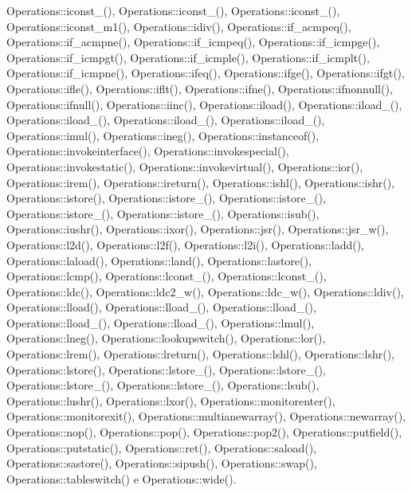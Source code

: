 Operations\+::iconst\+\_(), Operations\+::iconst\+\_(), Operations\+::iconst\+\_(), Operations\+::iconst\+\_\+m1(), Operations\+::idiv(), Operations\+::if\+\_\+acmpeq(), Operations\+::if\+\_\+acmpne(), Operations\+::if\+\_\+icmpeq(), Operations\+::if\+\_\+icmpge(), Operations\+::if\+\_\+icmpgt(), Operations\+::if\+\_\+icmple(), Operations\+::if\+\_\+icmplt(), Operations\+::if\+\_\+icmpne(), Operations\+::ifeq(), Operations\+::ifge(), Operations\+::ifgt(), Operations\+::ifle(), Operations\+::iflt(), Operations\+::ifne(), Operations\+::ifnonnull(), Operations\+::ifnull(), Operations\+::iinc(), Operations\+::iload(), Operations\+::iload\+\_(), Operations\+::iload\+\_(), Operations\+::iload\+\_(), Operations\+::iload\+\_(), Operations\+::imul(), Operations\+::ineg(), Operations\+::instanceof(), Operations\+::invokeinterface(), Operations\+::invokespecial(), Operations\+::invokestatic(), Operations\+::invokevirtual(), Operations\+::ior(), Operations\+::irem(), Operations\+::ireturn(), Operations\+::ishl(), Operations\+::ishr(), Operations\+::istore(), Operations\+::istore\+\_(), Operations\+::istore\+\_(), Operations\+::istore\+\_(), Operations\+::istore\+\_(), Operations\+::isub(), Operations\+::iushr(), Operations\+::ixor(), Operations\+::jsr(), Operations\+::jsr\+\_\+w(), Operations\+::l2d(), Operations\+::l2f(), Operations\+::l2i(), Operations\+::ladd(), Operations\+::laload(), Operations\+::land(), Operations\+::lastore(), Operations\+::lcmp(), Operations\+::lconst\+\_(), Operations\+::lconst\+\_(), Operations\+::ldc(), Operations\+::ldc2\+\_\+w(), Operations\+::ldc\+\_\+w(), Operations\+::ldiv(), Operations\+::lload(), Operations\+::lload\+\_(), Operations\+::lload\+\_(), Operations\+::lload\+\_(), Operations\+::lload\+\_(), Operations\+::lmul(), Operations\+::lneg(), Operations\+::lookupswitch(), Operations\+::lor(), Operations\+::lrem(), Operations\+::lreturn(), Operations\+::lshl(), Operations\+::lshr(), Operations\+::lstore(), Operations\+::lstore\+\_(), Operations\+::lstore\+\_(), Operations\+::lstore\+\_(), Operations\+::lstore\+\_(), Operations\+::lsub(), Operations\+::lushr(), Operations\+::lxor(), Operations\+::monitorenter(), Operations\+::monitorexit(), Operations\+::multianewarray(), Operations\+::newarray(), Operations\+::nop(), Operations\+::pop(), Operations\+::pop2(), Operations\+::putfield(), Operations\+::putstatic(), Operations\+::ret(), Operations\+::saload(), Operations\+::sastore(), Operations\+::sipush(), Operations\+::swap(), Operations\+::tableswitch() e Operations\+::wide().

